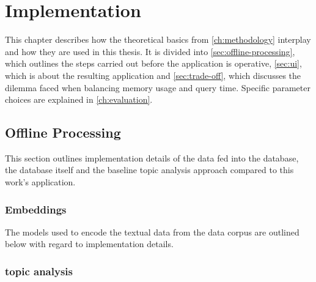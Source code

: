 \chapter{Implementation}\label{ch:implementation}

This chapter describes how the theoretical basics from \autoref{ch:methodology} interplay and how they are used in this thesis.
It is divided into \autoref{sec:offline-processing}, which outlines the steps carried out before the application is operative, 
\autoref{sec:ui}, which is about the resulting application and \autoref{sec:trade-off}, which discusses the dilemma faced when balancing memory usage and query time. 
Specific parameter choices are explained in \autoref{ch:evaluation}.


\section{Offline Processing}\label{sec:offline-processing}
This section outlines implementation details of the data fed into the database, the database itself and the baseline topic analysis approach compared to this work's application.




\subsection{Embeddings}\label{subsec:impl-embeddings}
The models used to encode the textual data from the data corpus are outlined below with regard to implementation details.















\subsection{topic analysis}\label{impl-topic-modeling}

